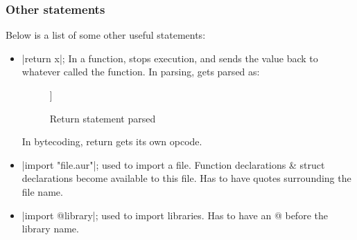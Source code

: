 \documentclass[12pt, letterpaper, oneside]{article}
\begin{document}
	\subsubsection{Other statements}
	Below is a list of some other useful statements:
	\begin{itemize}
		\item[--] \spverb|return x|; In a function, stops execution, and sends the value back to whatever called the function. In parsing, gets parsed as:
		\begin{figure}[h]
			\begin{forest}
				[RETURN
				[Left: value]
				]
			\end{forest}
			\caption{Return statement parsed}
		\end{figure} \newline
		In bytecoding, return gets its own opcode.
		\item[--] \spverb|import "file.aur"|; used to import a file. Function declarations \& struct declarations become available to this file. Has to have quotes surrounding the file name.
		\item[--] \spverb|import @library|; used to import libraries. Has to have an @ before the library name.
	\end{itemize}
	
	
\end{document}

